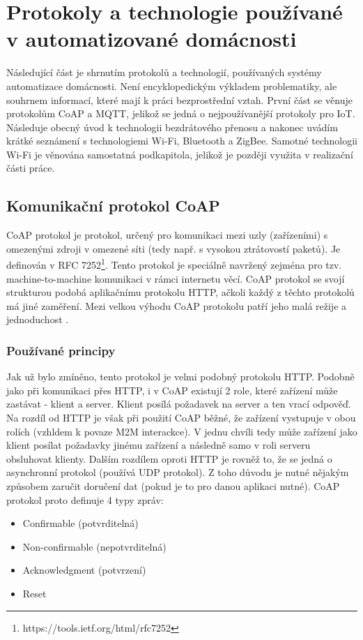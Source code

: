 \chapter{Protokoly a technologie používané v automatizované domácnosti}
Následující část je shrnutím protokolů a technologií, používaných systémy automatizace domácnosti. Není encyklopedickým výkladem problematiky, ale souhrnem informací, které mají k práci bezprostřední vztah. První část se věnuje protokolům CoAP a MQTT, jelikož se jedná o nejpoužívanější protokoly pro IoT. Následuje obecný úvod k technologii bezdrátového přenosu a nakonec uvádím krátké seznámení s technologiemi Wi-Fi, Bluetooth a ZigBee. Samotné technologii Wi-Fi je věnována samostatná podkapitola, jelikož je později využita v realizační části práce.

\section{Komunikační protokol CoAP}
CoAP protokol je protokol, určený pro komunikaci mezi uzly (zařízeními) s omezenými zdroji v omezené síti (tedy např. s vysokou ztrátovostí paketů). Je definován v RFC 7252\footnote{https://tools.ietf.org/html/rfc7252}. Tento protokol je speciálně navržený zejména pro tzv. machine-to-machine komunikaci v rámci internetu věcí. CoAP protokol se svojí strukturou podobá aplikačnímu protokolu HTTP, ačkoli každý z těchto protokolů má jiné zaměření. Mezi velkou výhodu CoAP protokolu patří jeho malá režije a jednoduchost \cite{CoAPStepByStep}.

\subsection*{Používané principy}
Jak už bylo zmíněno, tento protokol je velmi podobný protokolu HTTP. Podobně jako při komunikaci přes HTTP, i v CoAP existují 2 role, které zařízení může zastávat - klient a server. Klient posílá požadavek na server a ten vrací odpověď. Na rozdíl od HTTP je však při použití CoAP běžné, že zařízení vystupuje v obou rolích (vzhldem k povaze M2M interackce). V jednu chvíli tedy může zařízení jako klient posílat požadavky jinému zařízení a následně samo v roli serveru obsluhovat klienty.
Dalším rozdílem oproti HTTP je rovněž to, že se jedná o asynchronní protokol (používá UDP protokol). Z toho důvodu je nutné nějakým způsobem zaručit doručení dat (pokud je to pro danou aplikaci nutné). CoAP protokol proto definuje 4 typy zpráv:
\begin{itemize}
    \item Confirmable (potvrditelná)
    \item Non-confirmable (nepotvrditelná)
    \item Acknowledgment (potvrzení)
    \item Reset \cite{RFC7252}
\end{itemize}


